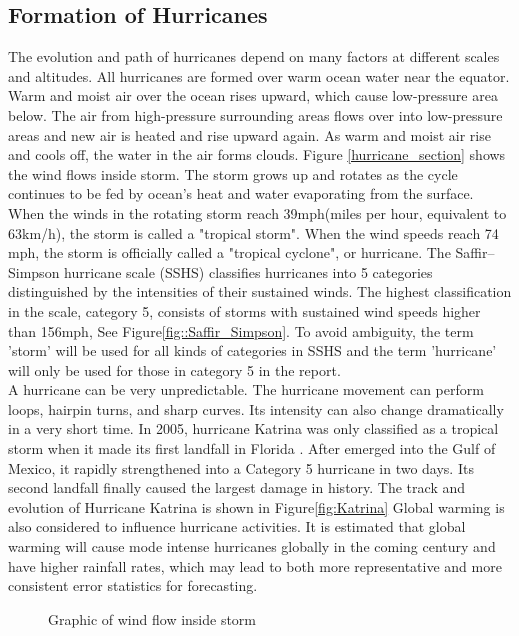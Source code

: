 \subsection{Formation of Hurricanes}
The evolution and path of hurricanes depend on many factors at different scales and altitudes. All hurricanes are formed over warm ocean water near the equator. Warm and moist air over the ocean rises upward, which cause low-pressure area below. The air from high-pressure surrounding areas flows over into low-pressure areas and new air is heated and rise upward again. As warm and moist air rise and cools off, the water in the air forms clouds. Figure \ref{hurricane_section} shows the wind flows inside storm. The storm grows up and rotates as the cycle continues to be fed by ocean's heat and water evaporating from the surface. When the winds in the rotating storm reach 39mph(miles per hour, equivalent to 63km/h), the storm is called a "tropical storm". When the wind speeds reach 74 mph, the storm is officially called a "tropical cyclone", or hurricane. The Saffir–Simpson hurricane scale (SSHS) classifies hurricanes into 5 categories distinguished by the intensities of their sustained winds. The highest classification in the scale, category 5, consists of storms with sustained wind speeds higher than 156mph, See Figure\ref{fig::Saffir_Simpson}. To avoid ambiguity, the term 'storm' will be used for all kinds of categories in SSHS and the term 'hurricane' will only be used for those in category 5 in the report. \\
A hurricane can be very unpredictable. The hurricane movement can perform loops, hairpin turns, and sharp curves. Its intensity can also change dramatically in a very short time. In 2005, hurricane Katrina was only classified as a tropical storm when it made its first landfall in Florida . After emerged into the Gulf of Mexico, it rapidly strengthened into a Category 5 hurricane in two days. Its second landfall finally caused the largest damage in history. The track and evolution of Hurricane Katrina is shown in Figure\ref{fig:Katrina}  Global warming is also considered to influence hurricane activities. It is estimated that global warming will cause mode intense hurricanes globally in the coming century and have higher rainfall rates\cite{knutson2013dynamical}, which may lead to both more representative and more consistent error statistics for forecasting.

\begin{figure}[t]
	\begin{center}
		\hsize {}
	\end{center}
	\caption{Graphic of wind flow inside storm \cite{hurricane_energy}}
	\label{fig:hurricane_section}
\end{figure}



